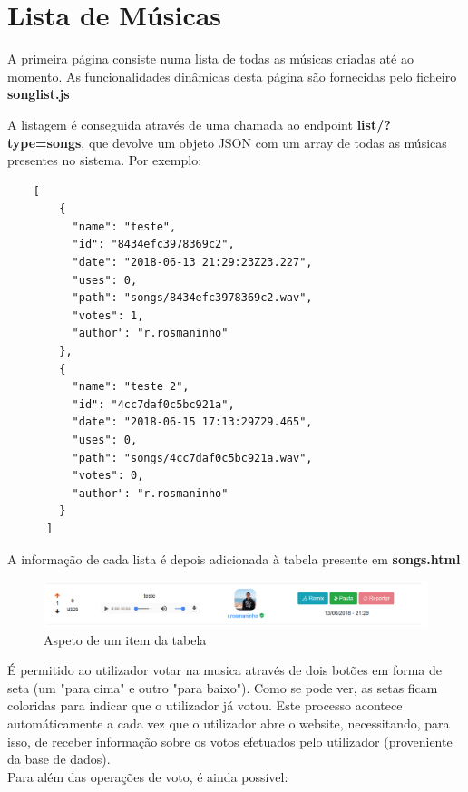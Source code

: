 \documentclass{report}
\begin{document}
\section{Lista de Músicas}
\label{sec.songlist}

A primeira página consiste numa lista de todas as músicas criadas até ao momento.
As funcionalidades dinâmicas desta página são fornecidas pelo ficheiro \textbf{songlist.js}

A listagem é conseguida através de uma chamada ao endpoint \textbf{list/?type=songs},
que devolve um objeto JSON com um array de todas as músicas presentes no sistema. Por exemplo:\\

\begin{lstlisting}
    [
        {
          "name": "teste",
          "id": "8434efc3978369c2",
          "date": "2018-06-13 21:29:23Z23.227",
          "uses": 0,
          "path": "songs/8434efc3978369c2.wav",
          "votes": 1,
          "author": "r.rosmaninho"
        },
        {
          "name": "teste 2",
          "id": "4cc7daf0c5bc921a",
          "date": "2018-06-15 17:13:29Z29.465",
          "uses": 0,
          "path": "songs/4cc7daf0c5bc921a.wav",
          "votes": 0,
          "author": "r.rosmaninho"
        }
      ]
\end{lstlisting}

A informação de cada lista é depois adicionada à tabela presente em \textbf{songs.html} \\

\begin{figure}[H]
	\includegraphics[scale=0.35]{song_list_item.png}
	\caption{Aspeto de um item da tabela}
	\label{img.song_list_item}
\end{figure}

É permitido ao utilizador votar na musica através de dois botões em forma de seta (um "para cima" e outro "para baixo").
Como se pode ver, as setas ficam coloridas para indicar que o utilizador já votou. 
Este processo acontece automáticamente a cada vez que o utilizador abre o website, necessitando, para isso, de receber informação sobre os votos efetuados pelo utilizador (proveniente da base de dados). \\

Para além das operações de voto, é ainda possível:
\end{document}
